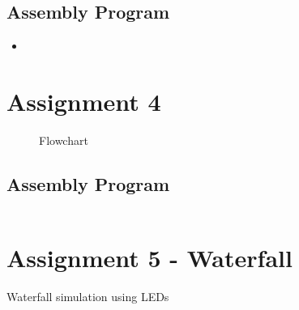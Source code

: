 \documentclass[a4paper, 12pt]{article}
\newcommand{\avrasm}[2]{
\begin{itemize}
\item[]
\end{itemize}
}
\begin{document}

\newpage

\subsection{Assembly Program}
\avrasm{../src/a3.asm}{}
\newpage

\section{Assignment 4}



\begin{algorithm}
\begin{algorithmic}
\State{}
\EndProcedure
\caption{}
\label{}
\end{algorithmic}
\end{algorithm}

\begin{figure}[h]

\caption{Flowchart}
\label{}
\end{figure}




\subsection{Assembly Program}
\begin{lstlisting}

\end{lstlisting}
\newpage

\section{Assignment 5 - Waterfall}



\begin{algorithm}
\begin{algorithmic}
 
\Repeat
{}
\Until{$\infty$}
\EndProcedure
\caption{Waterfall simulation using LEDs}
\label{}
\end{algorithmic}
\end{algorithm}
\end{document}
